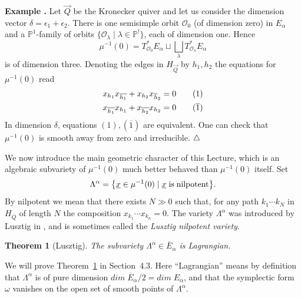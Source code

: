 \documentclass[a4paper,10pt]{amsart}
\def\endexample{$\hfill \triangle$}
\def\vecdq{\overline{Q}}
\def\endexample{$\hfill \triangle$}
\def\a{\alpha}
\newtheorem{theo}{\bf{Theorem}}[section]
\numberwithin{equation}{section}
\begin{document}
\addtocounter{theo}{1}
\noindent \textbf{Example \thetheo .} Let $\vec{Q}$ be the Kronecker quiver and let us consider the dimension vector $\delta=\epsilon_1 + \epsilon_2$. There is one semisimple orbit $\mathcal{O}_0$ (of dimension zero) in $E_{\a}$ and a $\mathbb{P}^1$-family of orbits $\{\mathcal{O}_{\lambda}\;|\; \lambda \in \mathbb{P}^!\}$, each of dimension one. Hence
$$\mu^{-1}(0)=T^*_{\mathcal{O}_0}E_{\a} \sqcup \bigsqcup_{\lambda} T^*_{\mathcal{O}_{\lambda}}E_{\a}$$
is of dimension three. Denoting the edges in $H_{\vec{Q}}$ by $h_1, h_2$ the equations for 
$\mu^{-1}(0)$ read
\begin{align}
x_{h_1}x_{\overline{h_1}} + x_{h_2} x_{\overline{h}_2}&=0 \tag{$1$}\\
x_{\overline{h_1}}x_{{h_1}} + x_{\overline{h_2}} x_{{h}_2}&=0 \tag{$\overline{1}$}
\end{align}
In dimension $\delta$, equations $(1), (\overline{1})$ are equivalent. One can check that $\mu^{-1}(0)$ 
is smooth away from zero and irreducible.
\endexample

\vspace{.2in}

We now introduce the main geometric character of this Lecture, which is an algebraic subvariety of $\mu^{-1}(0)$ much better behaved than $\mu^{-1}(0)$ itself. Set
\begin{equation}\label{E:deflambda}
\Lambda^{\a}=\big\{ \underline{x} \in \mu^{-1}(0)\;|\; \underline{x}\;\text{is\;nilpotent}\big\}.
\end{equation}
By nilpotent we mean that there exists $N \gg 0$ such that, for any path $k_1 \cdots k_N$ in $H_{\vecdq}$ of length $N$ the composition $x_{k_1} \cdots x_{k_n}=0$. The variety $\Lambda^{\a}$ was introduced by Lusztig in \cite{Lusaff}, and is sometimes called the \textit{Lusztig nilpotent variety}.

\vspace{.1in}

\begin{theo}[Lusztig]\label{T:LUlambda} The subvariety $\Lambda^\a \in \overline{E}_{\a}$ is Lagrangian.
\end{theo}

\vspace{.1in}

\noindent
We will prove Theorem~\ref{T:LUlambda} in Section~4.3. Here ``Lagrangian'' means by definition that $\Lambda^{\a}$ is of pure dimension $dim\;\overline{E}_{\a}/2=dim\;E_{\a}$, and that the symplectic form $\omega$ vanishes on the open set of smooth points of $\Lambda^{\a}$. 
\end{document}
